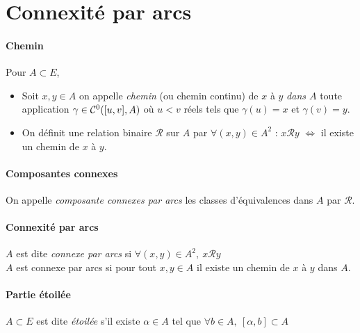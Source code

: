 \section{Connexité par arcs}
		
		\vspace{-15pt}
		\traitd
		\paragraph{Chemin}
			Pour $A\subset E$, 
			\begin{itemize}
				\item Soit $x,y\in A$ on appelle \emph{chemin} (ou chemin continu) de $x$ à $y$ \emph{dans $A$} toute application $\gamma \in {\mathcal{C}}^0 ([u,v],A)$ où $u<v$ réels tels que $\gamma (u) = x$ et $\gamma (v) = y$.
				\item On définit une relation binaire $\mathcal{R}$ sur $A$ par $\forall (x,y) \in A^2$ : $x\mathcal{R} y$ $\Leftrightarrow$ il existe un chemin de $x$ à $y$.
			\end{itemize} 
		\trait
		

		\newpage
		
		\traitd
		\paragraph{Composantes connexes} 
			On appelle \emph{composante connexes par arcs} les classes d'équivalences dans $A$ par $\mathcal{R}$.
		\trait \vspace{-15pt}
		
		 \vspace{-25pt}
		
		\traitd
		\paragraph{Connexité par arcs}
			$A$ est dite \emph{connexe par arcs} si $\forall (x,y) \in A^2 ,~x\mathcal{R} y$ \\$A$ est connexe par arcs si 
			pour tout $x,y \in A$ il existe un chemin de $x$ à $y$ dans $A$.	
		\trait
		
		
		\traitd
		\paragraph{Partie étoilée}
			$A\subset E$ est dite \emph{étoilée} s'il existe $\alpha	\in A$ tel que $\forall b \in A ,~[\alpha ,b] \subset A$ 
		\trait
		
